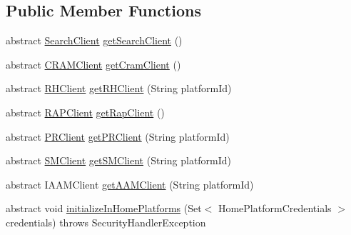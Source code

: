 \subsection*{Public Member Functions}
\begin{DoxyCompactItemize}
\item 
abstract \hyperlink{interfaceeu_1_1h2020_1_1symbiote_1_1client_1_1interfaces_1_1SearchClient}{Search\+Client} \hyperlink{classeu_1_1h2020_1_1symbiote_1_1client_1_1AbstractSymbIoTeClientFactory_a458f21a4bad76cd5026da1262bc47d30}{get\+Search\+Client} ()
\item 
abstract \hyperlink{interfaceeu_1_1h2020_1_1symbiote_1_1client_1_1interfaces_1_1CRAMClient}{C\+R\+A\+M\+Client} \hyperlink{classeu_1_1h2020_1_1symbiote_1_1client_1_1AbstractSymbIoTeClientFactory_aa0f2efa42866f12a423f24774449651b}{get\+Cram\+Client} ()
\item 
abstract \hyperlink{interfaceeu_1_1h2020_1_1symbiote_1_1client_1_1interfaces_1_1RHClient}{R\+H\+Client} \hyperlink{classeu_1_1h2020_1_1symbiote_1_1client_1_1AbstractSymbIoTeClientFactory_ae2df2c1d0b1e92fb7aee36ad8269cb37}{get\+R\+H\+Client} (String platform\+Id)
\item 
abstract \hyperlink{interfaceeu_1_1h2020_1_1symbiote_1_1client_1_1interfaces_1_1RAPClient}{R\+A\+P\+Client} \hyperlink{classeu_1_1h2020_1_1symbiote_1_1client_1_1AbstractSymbIoTeClientFactory_a9c24416e937ae089d8ce7811a4c32ea1}{get\+Rap\+Client} ()
\item 
abstract \hyperlink{interfaceeu_1_1h2020_1_1symbiote_1_1client_1_1interfaces_1_1PRClient}{P\+R\+Client} \hyperlink{classeu_1_1h2020_1_1symbiote_1_1client_1_1AbstractSymbIoTeClientFactory_aef9209c8adbf6c3f1f630c11e33ead8f}{get\+P\+R\+Client} (String platform\+Id)
\item 
abstract \hyperlink{interfaceeu_1_1h2020_1_1symbiote_1_1client_1_1interfaces_1_1SMClient}{S\+M\+Client} \hyperlink{classeu_1_1h2020_1_1symbiote_1_1client_1_1AbstractSymbIoTeClientFactory_a340180376b7d10fbbee1d8d91ef6819e}{get\+S\+M\+Client} (String platform\+Id)
\item 
abstract I\+A\+A\+M\+Client \hyperlink{classeu_1_1h2020_1_1symbiote_1_1client_1_1AbstractSymbIoTeClientFactory_a0ac8bc008cf2649e47eb64c19a69b457}{get\+A\+A\+M\+Client} (String platform\+Id)
\item 
abstract void \hyperlink{classeu_1_1h2020_1_1symbiote_1_1client_1_1AbstractSymbIoTeClientFactory_afca76e860ef08850f4fb985527542447}{initialize\+In\+Home\+Platforms} (Set$<$ Home\+Platform\+Credentials $>$ credentials)  throws Security\+Handler\+Exception
\end{DoxyCompactItemize}
